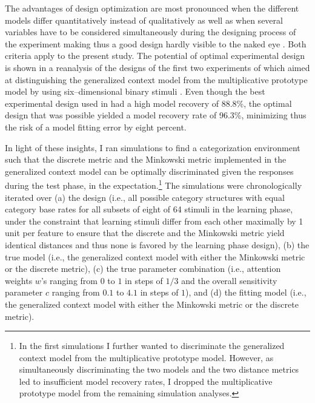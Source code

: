 \documentclass[a4paper,man,natbib]{apa6}
\begin{document}
The advantages of design optimization are most pronounced when the different models differ quantitatively instead of qualitatively as well as when several variables have to be considered simultaneously during the designing process of the experiment making thus a good design hardly visible to the naked eye \citep{myung2009optimal}. Both criteria apply to the present study.
The potential of optimal experimental design is shown in a reanalysis of the designs of the first two experiments of \cite{smith1998prototypes} which aimed at distinguishing the generalized context model \citep{nosofsky1986attention} from the multiplicative prototype model \citep{smith1998prototypes} by using six--dimensional binary stimuli \citep{myung2009optimal}. Even though the best experimental design used in \citeauthor{smith1998prototypes} had a high model recovery of 88.8\%, the optimal design that was possible yielded a model recovery rate of 96.3\%, minimizing thus the risk of a model fitting error by eight percent.  

In light of these insights, I ran simulations to find a categorization environment such that the discrete metric and the Minkowski metric implemented in the generalized context model can be optimally discriminated given the responses during the test phase, in the expectation.\footnote{In the first simulations I further wanted to discriminate the generalized context model from the multiplicative prototype model. However, as simultaneously discriminating the two models and the two distance metrics led to insufficient model recovery rates, I dropped the multiplicative prototype model from the remaining simulation analyses.} The simulations were chronologically iterated over (a) the design (i.e., all possible category structures with equal category base rates for all subsets of eight of 64 stimuli in the learning phase, under the constraint that learning stimuli differ from each other maximally by 1 unit per feature to ensure that the discrete and the Minkowski metric yield identical distances and thus none is favored by the learning phase design), (b) the true model (i.e., the generalized context model with either the Minkowski metric or the discrete metric), (c) the true parameter combination (i.e., attention weights $w$'s ranging from $0$ to $1$ in steps of $1/3$ and the overall sensitivity parameter $c$ ranging from $0.1$ to $4.1$ in steps of $1$), and (d) the fitting model (i.e., the generalized context model with either the Minkowski metric or the discrete metric).
\end{document}
